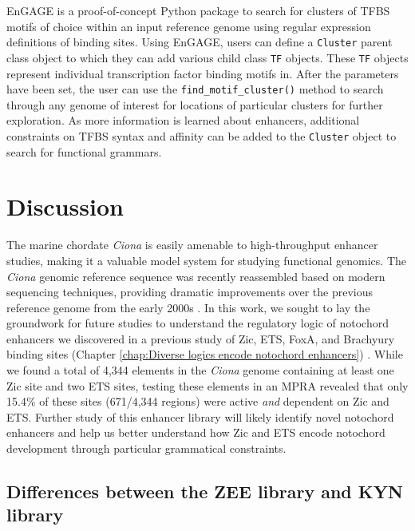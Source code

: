 EnGAGE is a proof-of-concept Python package to search for clusters of TFBS motifs of choice within an input reference genome using regular expression definitions of binding sites. Using EnGAGE, users can define a \verb|Cluster| parent class object to which they can add various child class \verb|TF| objects. These \verb|TF| objects represent individual transcription factor binding motifs in. After the parameters have been set, the user can use the \verb|find_motif_cluster()| method to search through any genome of interest for locations of particular clusters for further exploration. As more information is learned about enhancers, additional constraints on TFBS syntax and affinity can be added to the \verb|Cluster| object to search for functional grammars.

\section{Discussion}

The marine chordate \textit{Ciona} is easily amenable to high-throughput enhancer studies, making it a valuable model system for studying functional genomics. The \textit{Ciona} genomic reference sequence was recently reassembled based on modern sequencing techniques, providing dramatic improvements over the previous reference genome from the early 2000s \cite{satou2019,dehal2002}. In this work, we sought to lay the groundwork for future studies to understand the regulatory logic of notochord enhancers we discovered in a previous study of Zic, ETS, FoxA, and Brachyury binding sites (Chapter \ref{chap:Diverse logics encode notochord enhancers}) \cite{song2022}. While we found a total of 4,344 elements in the \textit{Ciona} genome containing at least one Zic site and two ETS sites, testing these elements in an MPRA revealed that only 15.4\% of these sites (671/4,344 regions) were active \textit{and} dependent on Zic and ETS. Further study of this enhancer library will likely identify novel notochord enhancers and help us better understand how Zic and ETS encode notochord development through particular grammatical constraints. 

\subsection{Differences between the ZEE library and KYN library}

